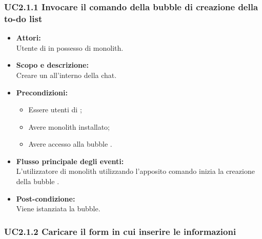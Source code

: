 \subsubsection{UC2.1.1 Invocare il comando della bubble di creazione della to-do list} \label{UC2.1.1}

\begin{itemize}
	\item \textbf{Attori:}
	\\Utente di  in possesso di monolith.
	\item \textbf{Scopo e descrizione:} 
	\\Creare un  all'interno della chat.
	\item \textbf{Precondizioni:}
	\begin{itemize}
		\item Essere utenti di ;
		\item Avere monolith installato;
		\item Avere accesso alla bubble .
	\end{itemize}
	\item \textbf{Flusso principale degli eventi:}
	\\L’utilizzatore di monolith utilizzando l'apposito comando inizia la creazione della bubble .
	\item \textbf{Post-condizione:}
	\\Viene istanziata la bubble.
\end{itemize}

\subsubsection{UC2.1.2 Caricare il form in cui inserire le informazioni} \label{UC2.1.2}

